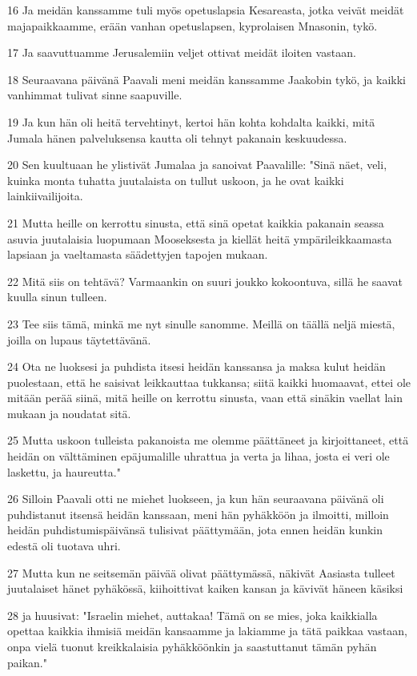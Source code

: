 \par 16 Ja meidän kanssamme tuli myös opetuslapsia Kesareasta, jotka veivät meidät majapaikkaamme, erään vanhan opetuslapsen, kyprolaisen Mnasonin, tykö.
\par 17 Ja saavuttuamme Jerusalemiin veljet ottivat meidät iloiten vastaan.
\par 18 Seuraavana päivänä Paavali meni meidän kanssamme Jaakobin tykö, ja kaikki vanhimmat tulivat sinne saapuville.
\par 19 Ja kun hän oli heitä tervehtinyt, kertoi hän kohta kohdalta kaikki, mitä Jumala hänen palveluksensa kautta oli tehnyt pakanain keskuudessa.
\par 20 Sen kuultuaan he ylistivät Jumalaa ja sanoivat Paavalille: "Sinä näet, veli, kuinka monta tuhatta juutalaista on tullut uskoon, ja he ovat kaikki lainkiivailijoita.
\par 21 Mutta heille on kerrottu sinusta, että sinä opetat kaikkia pakanain seassa asuvia juutalaisia luopumaan Mooseksesta ja kiellät heitä ympärileikkaamasta lapsiaan ja vaeltamasta säädettyjen tapojen mukaan.
\par 22 Mitä siis on tehtävä? Varmaankin on suuri joukko kokoontuva, sillä he saavat kuulla sinun tulleen.
\par 23 Tee siis tämä, minkä me nyt sinulle sanomme. Meillä on täällä neljä miestä, joilla on lupaus täytettävänä.
\par 24 Ota ne luoksesi ja puhdista itsesi heidän kanssansa ja maksa kulut heidän puolestaan, että he saisivat leikkauttaa tukkansa; siitä kaikki huomaavat, ettei ole mitään perää siinä, mitä heille on kerrottu sinusta, vaan että sinäkin vaellat lain mukaan ja noudatat sitä.
\par 25 Mutta uskoon tulleista pakanoista me olemme päättäneet ja kirjoittaneet, että heidän on välttäminen epäjumalille uhrattua ja verta ja lihaa, josta ei veri ole laskettu, ja haureutta."
\par 26 Silloin Paavali otti ne miehet luokseen, ja kun hän seuraavana päivänä oli puhdistanut itsensä heidän kanssaan, meni hän pyhäkköön ja ilmoitti, milloin heidän puhdistumispäivänsä tulisivat päättymään, jota ennen heidän kunkin edestä oli tuotava uhri.
\par 27 Mutta kun ne seitsemän päivää olivat päättymässä, näkivät Aasiasta tulleet juutalaiset hänet pyhäkössä, kiihoittivat kaiken kansan ja kävivät häneen käsiksi
\par 28 ja huusivat: "Israelin miehet, auttakaa! Tämä on se mies, joka kaikkialla opettaa kaikkia ihmisiä meidän kansaamme ja lakiamme ja tätä paikkaa vastaan, onpa vielä tuonut kreikkalaisia pyhäkköönkin ja saastuttanut tämän pyhän paikan."
